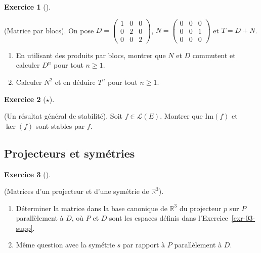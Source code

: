 \documentclass[
  french,
  letterpaper,
  DIV=11,
  numbers=noendperiod]{scrreprt}
\theoremstyle{plain}
\theoremstyle{definition}
\theoremstyle{plain}
\theoremstyle{plain}
\theoremstyle{definition}
\newtheorem{exercise}{Exercice}[chapter]
\theoremstyle{definition}
\theoremstyle{plain}
\theoremstyle{remark}
\begin{document}
\begin{exercise}[]\protect\hypertarget{exr-03-matrice-par-bloc}{}\label{exr-03-matrice-par-bloc}

(Matrice par blocs). On pose \(D=\begin{pmatrix}
   1&0&0\\
   0&2&0\\
   0&0&2
\end{pmatrix}\), \(N = \begin{pmatrix}
    0&0&0\\
    0&0&1\\
    0&0&0
\end{pmatrix}\) et \(T = D+N\).

\begin{enumerate}
\def\labelenumi{\arabic{enumi}.}
\item
  En utilisant des produits par blocs, montrer que \(N\) et \(D\)
  commutent et calculer \(D^{n}\) pour tout \(n \geqslant 1\).
\item
  Calculer \(N^{2}\) et en déduire \(T^{n}\) pour tout
  \(n \geqslant 1\).
\end{enumerate}

\end{exercise}

\begin{exercise}[\(\star\)]\protect\hypertarget{exr-03-0003}{}\label{exr-03-0003}

(Un résultat général de stabilité). Soit \(f\in\mathcal{L}(E)\). Montrer
que \(\mathrm{Im}(f)\) et \(\ker(f)\) sont stables par \(f\).

\end{exercise}

\subsection{Projecteurs et symétries}\label{projecteurs-et-symuxe9tries}

\begin{exercise}[]\protect\hypertarget{exr-03-proj-2}{}\label{exr-03-proj-2}

(Matrices d'un projecteur et d'une symétrie de \(\mathbb{R}^{3}\)).

\begin{enumerate}
\def\labelenumi{\arabic{enumi}.}
\item
  Déterminer la matrice dans la base canonique de \(\mathbb{R}^{3}\) du
  projecteur \(p\) sur \(P\) parallèlement à \(D\), où \(P\) et \(D\)
  sont les espaces définis dans l'Exercice~\ref{exr-03-supp}.
\item
  Même question avec la symétrie \(s\) par rapport à \(P\) parallèlement
  à \(D\).
\end{enumerate}

\end{exercise}
\end{document}
